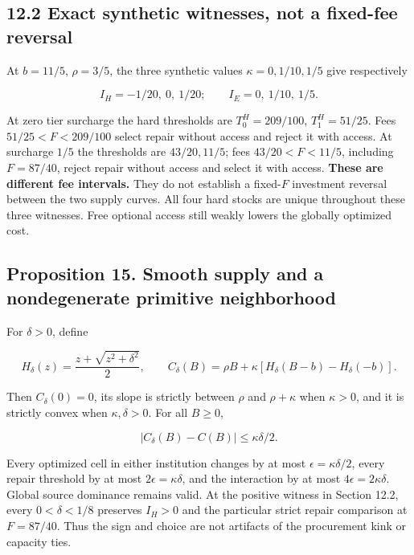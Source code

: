 \documentclass[
  11pt,
  a4paper,
]{article}
\begin{document}
\hypertarget{exact-synthetic-witnesses-not-a-fixed-fee-reversal}{%
\subsection{12.2 Exact synthetic witnesses, not a fixed-fee
reversal}\label{exact-synthetic-witnesses-not-a-fixed-fee-reversal}}

At \(b=11/5\), \(\rho=3/5\), the three synthetic values
\(\kappa=0,1/10,1/5\) give respectively

\[I_H=-1/20,\ 0,\ 1/20;\qquad I_E=0,\ 1/10,\ 1/5.\tag{73}\]

At zero tier surcharge the hard thresholds are \(T^H_0=209/100\),
\(T^H_1=51/25\). Fees \(51/25<F<209/100\) select repair without access
and reject it with access. At surcharge \(1/5\) the thresholds are
\(43/20,11/5\); fees \(43/20<F<11/5\), including \(F=87/40\), reject
repair without access and select it with access. \textbf{These are
different fee intervals.} They do not establish a fixed-\(F\) investment
reversal between the two supply curves. All four hard stocks are unique
throughout these three witnesses. Free optional access still weakly
lowers the globally optimized cost.

\hypertarget{proposition-15.-smooth-supply-and-a-nondegenerate-primitive-neighborhood}{%
\subsection{Proposition 15. Smooth supply and a nondegenerate primitive
neighborhood}\label{proposition-15.-smooth-supply-and-a-nondegenerate-primitive-neighborhood}}

For \(\delta>0\), define

\[H_\delta(z)=\frac{z+\sqrt{z^2+\delta^2}}2,\qquad
C_\delta(B)=\rho B+\kappa[H_\delta(B-b)-H_\delta(-b)].\tag{74}\]

Then \(C_\delta(0)=0\), its slope is strictly between \(\rho\) and
\(\rho+\kappa\) when \(\kappa>0\), and it is strictly convex when
\(\kappa,\delta>0\). For all \(B\geq0\),

\[|C_\delta(B)-C(B)|\leq\kappa\delta/2.\tag{75}\]

Every optimized cell in either institution changes by at most
\(\epsilon=\kappa\delta/2\), every repair threshold by at most
\(2\epsilon=\kappa\delta\), and the interaction by at most
\(4\epsilon=2\kappa\delta\). Global source dominance remains valid. At
the positive witness in Section 12.2, every \(0<\delta<1/8\) preserves
\(I_H>0\) and the particular strict repair comparison at \(F=87/40\).
Thus the sign and choice are not artifacts of the procurement kink or
capacity ties.
\end{document}

